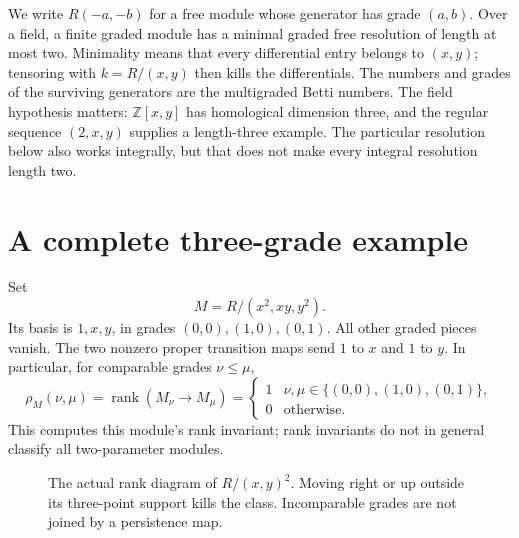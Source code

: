 We write $R(-a,-b)$ for a free module whose generator has grade $(a,b)$.
Over a field, a finite graded module has a minimal graded free resolution
of length at most two. Minimality means that every differential entry
belongs to $(x,y)$; tensoring with $k=R/(x,y)$ then kills the differentials.
The numbers and grades of the surviving generators are the multigraded
Betti numbers. The field hypothesis matters: $\mathbb Z[x,y]$ has
homological dimension three, and the regular sequence $(2,x,y)$ supplies
a length-three example. The particular resolution below also works
integrally, but that does not make every integral resolution length two.

\section{A complete three-grade example}
Set
\[
 M=R/(x^2,xy,y^2).
\]
Its basis is $1,x,y$, in grades $(0,0),(1,0),(0,1)$. All other graded
pieces vanish. The two nonzero proper transition maps send $1$ to $x$
and $1$ to $y$. In particular, for comparable grades $\nu\le\mu$,
\[
 \rho_M(\nu,\mu)=\operatorname{rank}(M_\nu\to M_\mu)
 =\begin{cases}1&\nu,\mu\in\{(0,0),(1,0),(0,1)\},\\0&\text{otherwise.}\end{cases}
\]
This computes this module's rank invariant; rank invariants do not in
general classify all two-parameter modules.

\begin{figure}[htbp]\centering
{}
\caption{The actual rank diagram of $R/(x,y)^2$. Moving right or up outside
its three-point support kills the class. Incomparable grades are not joined
by a persistence map.}\label{pers:rankfigure}
\end{figure}

